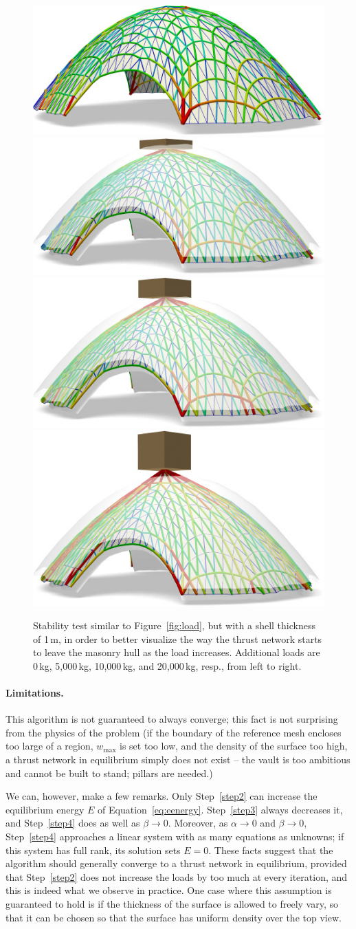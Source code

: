 \documentclass[review]{acmsiggraph}
\begin{document}
\begin{figure}[t]
\medskip
	\includegraphics[width=.23\textwidth]{fig/dome2-00.jpg}\hfill
	\includegraphics[width=.25\textwidth]{fig/dome2-05.jpg}\hfill
	\includegraphics[width=.25\textwidth]{fig/dome2-10.jpg}\hfill
	\includegraphics[width=.25\textwidth]{fig/dome2-20.jpg}
	\caption{Stability test similar to Figure~\protect\ref{fig:load},
but with a shell thickness of 1\,m, in order to better visualize the way
the thrust network starts to leave the masonry hull as the load increases.
Additional loads are 0\,kg, 5,000\,kg, 10,000\,kg, and 20,000\,kg, resp., from
left to right.} \label{fig:load2}

\end{figure}

\paragraph{Limitations.}

This algorithm is not guaranteed to always converge; this fact is not
surprising from the physics of the problem (if the boundary of the
reference mesh encloses too large of a region, $w_{\max}$ is set too low,
and the density of the surface too high, a thrust network in equilibrium
simply does not exist -- the vault is too ambitious and cannot be built to
stand; pillars are needed.)

We can, however, make a few remarks. Only Step~\ref{step2} can 
increase the equilibrium
 energy $E$ of Equation~\eqref{eq:eenergy}.
Step~\ref{step3} always decreases it, and Step~\ref{step4} does as well as $\beta \to 0$. Moreover, as $\alpha
\to 0$ and $\beta \to 0$, Step~\ref{step4} approaches a linear system with
as many equations as unknowns; if this system has full rank, its solution
sets $E=0$. These facts suggest that the algorithm should generally
converge to a thrust network in equilibrium, provided that
Step~\ref{step2} does not increase the loads by too much at every
iteration, and this is indeed what we observe in practice. One case where
this assumption is guaranteed to hold is if the thickness of the surface
is allowed to freely vary, so that it can be chosen so that the surface
has uniform density over the top view.
\end{document}
